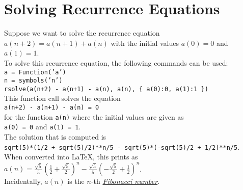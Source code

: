 \documentclass{report}
\begin{document}
\section{Solving Recurrence Equations}
Suppose we want to solve the recurrence equation
\\[0.2cm]
\hspace*{1.3cm}
$a(n+2) = a(n+1) + a(n)$  \quad with the initial values $a(0) = 0$ and $a(1) = 1$.
\\[0.2cm]
To solve this recurrence equation, the following commands can be used:
\\[0.2cm]
\hspace*{1.3cm}
\texttt{a = Function('a')}\\
\hspace*{1.3cm}
\texttt{n = symbols('n')} \\
\hspace*{1.3cm}
\texttt{rsolve(a(n+2) - a(n+1) - a(n), a(n), \{ a(0):0, a(1):1 \})}
\\[0.2cm]
This function call solves the equation
\\[0.2cm]
\hspace*{1.3cm}
\texttt{a(n+2) - a(n+1) - a(n) = 0} 
\\[0.2cm]
for the function \texttt{a(n)} where the initial values are given as
\\[0.2cm]
\hspace*{1.3cm}
 \texttt{a(0) = 0} \quad and \quad \texttt{a(1) = 1}. 
\\[0.2cm]
The solution that is computed is
\\[0.2cm]
\hspace*{1.3cm}
\texttt{sqrt(5)*(1/2 + sqrt(5)/2)**n/5 - sqrt(5)*(-sqrt(5)/2 + 1/2)**n/5}.
\\[0.2cm]
When converted into \LaTeX, this prints as
\\[0.2cm]
\hspace*{1.3cm}
$\displaystyle a(n) = \frac{\sqrt{5}}{5} \left(\frac{1}{2} + \frac{\sqrt{5}}{2}\right)^{n} - \frac{\sqrt{5}}{5} \left(- \frac{\sqrt{5}}{2} + \frac{1}{2}\right)^{n}$.
\\[0.2cm]
Incidentally, $a(n)$ is the $n$-th 
\href{http://en.wikipedia.org/wiki/Fibonacci_number}{\emph{Fibonacci number}}.
\end{document}
